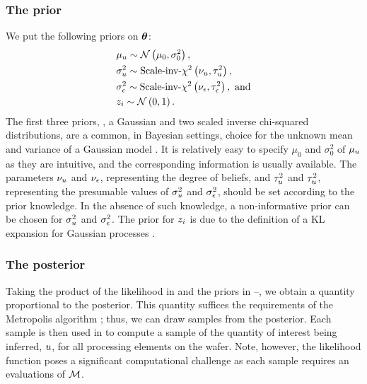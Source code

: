 \subsubsection{The prior}
We put the following priors on ${\boldsymbol\theta}$:
\begin{align}
  & \mu_\u \sim \gaussian{\mu_0}{\sigma^2_0}, \elabel{mu-u-prior} \\
  & \sigma^2_\u \sim \sichisquared{\nu_\u}{\tau^2_\u}, \elabel{sigma2-u-prior} \\
  & \sigma^2_\noise \sim \sichisquared{\nu_\noise}{\tau^2_\noise}, \text{ and} \elabel{sigma2-noise-prior} \\
  & \z_i \sim \gaussian{0}{1}. \elabel{z-prior}
\end{align}
The first three priors, \ie, a Gaussian and two scaled inverse chi-squared distributions, are a common, in Bayesian settings, choice for the unknown mean and variance of a Gaussian model \cite{gelman2004}. It is relatively easy to specify $\mu_0$ and $\sigma^2_0$ of $\mu_u$ as they are intuitive, and the corresponding information is usually available. The parameters $\nu_u$ and $\nu_\epsilon$, representing the degree of beliefs, and $\tau^2_u$ and $\tau^2_u$, representing the presumable values of $\sigma^2_u$ and $\sigma^2_\epsilon$, should be set according to the prior knowledge. In the absence of such knowledge, a non-informative prior can be chosen for $\sigma^2_u$ and $\sigma^2_\epsilon$. The prior for $z_i$ is due to the definition of a KL expansion for Gaussian processes \cite{marzouk2009}.

\subsubsection{The posterior}
Taking the product of the likelihood in  and the priors in --, we obtain a quantity proportional to the posterior. This quantity suffices the requirements of the Metropolis algorithm \cite{gelman2004}; thus, we can draw samples from the posterior. Each sample is then used in  to compute a sample of the quantity of interest being inferred, $u$, for all processing elements on the wafer. Note, however, the likelihood function poses a significant computational challenge as each sample requires an evaluations of $\model$.
